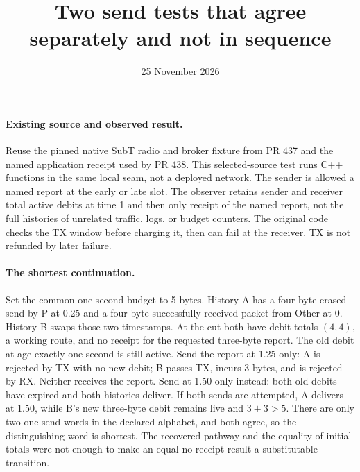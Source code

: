 \documentclass[11pt]{article}
\title{Two send tests that agree separately and not in sequence}
\date{25 November 2026}
\begin{document}
\maketitle
\paragraph{Existing source and observed result.}
Reuse the pinned native SubT radio and broker fixture from
\href{https://github.com/eternal-november/eos-research-programmes/pull/437}{PR 437}
and the named application receipt used by
\href{https://github.com/eternal-november/eos-research-programmes/pull/438}{PR 438}. This selected-source test runs C++ functions in the same local seam, not a deployed network. The sender is allowed a named report at the early or late slot. The observer retains sender and receiver total active debits at time 1 and then only receipt of the named report, not the full histories of unrelated traffic, logs, or budget counters. The original code checks the TX window before charging it, then can fail at the receiver. TX is not refunded by later failure.
\paragraph{The shortest continuation.}
Set the common one-second budget to 5 bytes. History A has a four-byte erased send by P at 0.25 and a four-byte successfully received packet from Other at 0. History B swaps those two timestamps. At the cut both have debit totals \((4,4)\), a working route, and no receipt for the requested three-byte report. The old debit at age exactly one second is still active. Send the report at 1.25 only: A is rejected by TX with no new debit; B passes TX, incurs 3 bytes, and is rejected by RX. Neither receives the report. Send at 1.50 only instead: both old debits have expired and both histories deliver. If both sends are attempted, A delivers at 1.50, while B's new three-byte debit remains live and \(3+3>5\). There are only two one-send words in the declared alphabet, and both agree, so the distinguishing word is shortest. The recovered pathway and the equality of initial totals were not enough to make an equal no-receipt result a substitutable transition.
\end{document}

